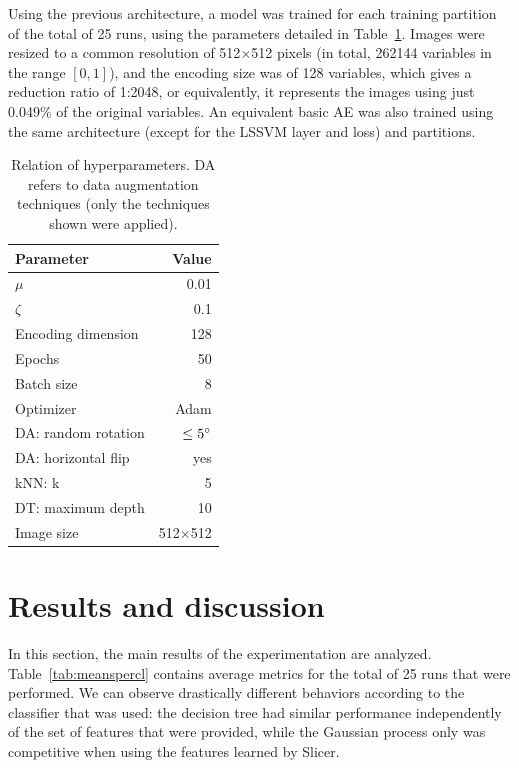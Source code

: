\documentclass[
	fontsize=11pt, %
	twoside=false, %
	open=any, %
	secnumdepth=1, %
]{kaobook}
\begin{document}
Using the previous architecture, a model was trained for each training partition of the total of 25 runs, using the parameters detailed in Table~\ref{tab:params}. Images were resized to a common resolution of 512$\times$512 pixels (in total, 262144 variables in the range $[0,1]$), and the encoding size was of 128 variables, which gives a reduction ratio of 1:2048, or equivalently, it represents the images using just 0.049\% of the original variables. An equivalent basic AE was also trained using the same architecture (except for the LSSVM layer and loss) and partitions.

\begin{table}[htbp]
    \centering
    \begin{tabular}{lr}
    \toprule
         \bfseries Parameter&\bfseries Value  \\\midrule
         \(\mu\)& 0.01\\
         \(\zeta\)&0.1\\
         Encoding dimension&128\\
         Epochs&50\\
         Batch size&8\\
         Optimizer&Adam\\
         DA: random rotation&$\leq5\degree$\\
         DA: horizontal flip&yes\\
         kNN: k&5\\
         DT: maximum depth&10\\
         Image size&512\(\times\)512\\
    \bottomrule
    \end{tabular}
    \caption{Relation of hyperparameters. DA refers to data augmentation techniques (only the techniques shown were applied).}
    \label{tab:params}
\end{table}

\section{Results and discussion}\label{sec.res}

In this section, the main results of the experimentation are analyzed. Table~\ref{tab:meanspercl} contains average metrics for the total of 25 runs that were performed. We can observe drastically different behaviors according to the classifier that was used: the decision tree had similar performance independently of the set of features that were provided, while the Gaussian process only was competitive when using the features learned by Slicer.
\end{document}
